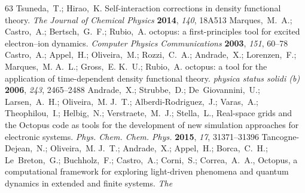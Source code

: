 \documentclass[journal=jacsat,manuscript=article]{achemso}
\begin{document}
\begin{mcitethebibliography}{63}
{\mcitedefaultendpunct}{\mcitedefaultseppunct}\relax
\EndOfBibitem
{}
Tsuneda,~T.; Hirao,~K. Self-interaction corrections in density functional
  theory. \emph{The Journal of Chemical Physics} \textbf{2014}, \emph{140},
  18A513\relax
\mciteBstWouldAddEndPuncttrue
\mciteSetBstMidEndSepPunct{\mcitedefaultmidpunct}
{\mcitedefaultendpunct}{\mcitedefaultseppunct}\relax
\EndOfBibitem
{}
Marques,~M.~A.; Castro,~A.; Bertsch,~G.~F.; Rubio,~A. octopus: a
  first-principles tool for excited electron–ion dynamics. \emph{Computer
  Physics Communications} \textbf{2003}, \emph{151}, 60--78\relax
\mciteBstWouldAddEndPuncttrue
\mciteSetBstMidEndSepPunct{\mcitedefaultmidpunct}
{\mcitedefaultendpunct}{\mcitedefaultseppunct}\relax
\EndOfBibitem
{}
Castro,~A.; Appel,~H.; Oliveira,~M.; Rozzi,~C.~A.; Andrade,~X.; Lorenzen,~F.;
  Marques,~M. A.~L.; Gross,~E. K.~U.; Rubio,~A. octopus: a tool for the
  application of time-dependent density functional theory. \emph{physica status
  solidi (b)} \textbf{2006}, \emph{243}, 2465--2488\relax
\mciteBstWouldAddEndPuncttrue
\mciteSetBstMidEndSepPunct{\mcitedefaultmidpunct}
{\mcitedefaultendpunct}{\mcitedefaultseppunct}\relax
\EndOfBibitem
{}
Andrade,~X.; Strubbe,~D.; De~Giovannini,~U.; Larsen,~A.~H.; Oliveira,~M. J.~T.;
  Alberdi-Rodriguez,~J.; Varas,~A.; Theophilou,~I.; Helbig,~N.;
  Verstraete,~M.~J.; Stella,~L.,   Real-space grids and the
  Octopus code as tools for the development of new simulation approaches for
  electronic systems. \emph{Phys. Chem. Chem. Phys.} \textbf{2015}, \emph{17},
  31371--31396\relax
\mciteBstWouldAddEndPuncttrue
\mciteSetBstMidEndSepPunct{\mcitedefaultmidpunct}
{\mcitedefaultendpunct}{\mcitedefaultseppunct}\relax
\EndOfBibitem
{}
Tancogne-Dejean,~N.; Oliveira,~M. J.~T.; Andrade,~X.; Appel,~H.; Borca,~C.~H.;
  Le~Breton,~G.; Buchholz,~F.; Castro,~A.; Corni,~S.; Correa,~A.~A.,
    Octopus, a computational framework for exploring light-driven
  phenomena and quantum dynamics in extended and finite systems. \emph{The
}
\end{mcitethebibliography}
\end{document}
